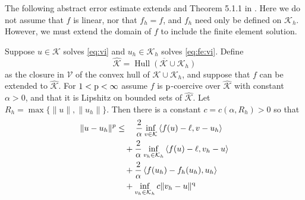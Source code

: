 \documentclass[hidelinks,onefignum,onetabnum,final]{siamart220329}  %
\newcommand{\cK}{\mathcal{K}}
\newcommand{\cV}{\mathcal{V}}
\newcommand{\hcK}{\widehat{\cK}}
\newcommand{\pp}{{\text{\textnormal{p}}}}
\newcommand{\qq}{{\text{\textnormal{q}}}}
\newcommand{\ip}[2]{\left<#1,#2\right>}
\DeclareMathOperator*{\Hull}{Hull}
\begin{document}
The following abstract error estimate extends \cite{Falk1974} and Theorem 5.1.1 in \cite{Ciarlet2002}.  Here we do not assume that $f$ is linear, nor that $f_h=f$, and $f_h$ need only be defined on $\cK_h$.  However, we must extend the domain of $f$ to include the finite element solution.

\begin{theorem} \label{thm:abstractestimate}  Suppose $u\in\cK$ solves \eqref{eq:vi} and $u_h\in\cK_h$ solves \eqref{eq:fe:vi}.  Define
\begin{equation}
\hcK = \overline{\Hull{(\cK \cup \cK_h)}}  \label{eq:convexhull}
\end{equation}
as the closure in $\cV$ of the convex hull of $\cK \cup \cK_h$, and suppose that $f$ can be extended to $\hcK$.  For $1<\pp<\infty$ assume $f$ is $\pp$-coercive over $\hcK$ with constant $\alpha>0$, and that it is Lipshitz on bounded sets of $\hcK$.  Let $R_h=\max\{\|u\|,\|u_h\|\}$.  Then there is a constant $c=c(\alpha,R_h)>0$ so that
\begin{align}
\|u-u_h\|^p &\le \quad \frac{2}{\alpha} \inf_{v\in\cK} \ip{f(u)-\ell}{v-u_h} \label{eq:abstractestimate} \\
   &\quad + \frac{2}{\alpha} \inf_{v_h\in\cK_h} \ip{f(u)-\ell}{v_h-u} \notag \\
   &\quad + \frac{2}{\alpha} \ip{f(u_h)-f_h(u_h)}{u_h} \notag \\
   &\quad + \inf_{v_h\in\cK_h} c \|v_h - u\|^\qq \notag
\end{align}
\end{theorem}
\end{document}
